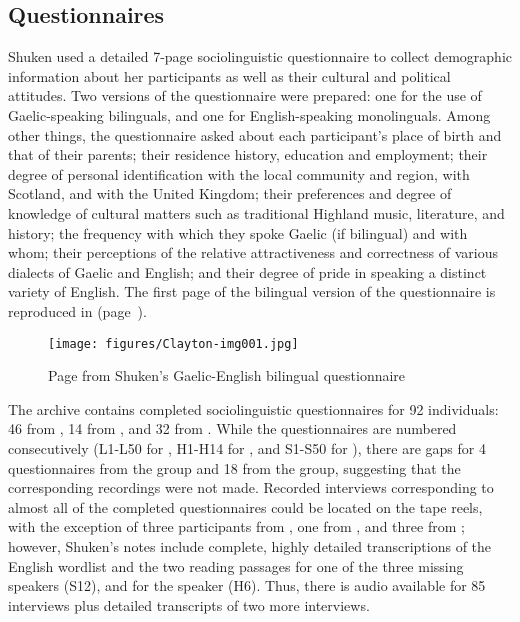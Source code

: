 \documentclass[output=paper,colorlinks,citecolor=brown]{langscibook}
\begin{document}
\subsection{Questionnaires}

Shuken used a detailed 7-page sociolinguistic questionnaire to collect demographic information about her participants as well as their cultural and political attitudes. Two versions of the questionnaire were prepared: one for the use of Gaelic-speaking bilinguals, and one for English-speaking monolinguals. Among other things, the questionnaire asked about each participant’s place of birth and that of their parents; their residence history, education and employment; their degree of personal identification with the local community and region, with Scotland, and with the United Kingdom; their preferences and degree of knowledge of cultural matters such as traditional Highland music, literature, and history; the frequency with which they spoke Gaelic (if bilingual) and with whom; their perceptions of the relative attractiveness and correctness of various dialects of Gaelic and English; and their degree of pride in speaking a distinct variety of English. The first page of the bilingual version of the questionnaire is reproduced in  (page~\pageref{fig:1}). 

\begin{figure}[hp]
\texttt{[image: figures/Clayton-img001.jpg]}
\caption{Page from Shuken's Gaelic-English bilingual questionnaire}
\label{fig:1}
\end{figure}

The archive contains completed sociolinguistic questionnaires for 92 individuals: 46 from , 14 from , and 32 from . While the questionnaires are numbered consecutively (L1-L50 for , H1-H14 for , and S1-S50 for ), there are gaps for 4 questionnaires from the  group and 18 from the  group, suggesting that the corresponding recordings were not made. Recorded interviews corresponding to almost all of the completed questionnaires could be located on the tape reels, with the exception of three participants from , one from , and three from ; however, Shuken’s notes include complete, highly detailed transcriptions of the English wordlist and the two reading passages for one of the three missing  speakers (S12), and for the  speaker (H6). Thus, there is audio available for 85 interviews plus detailed transcripts of two more interviews.
\end{document}
